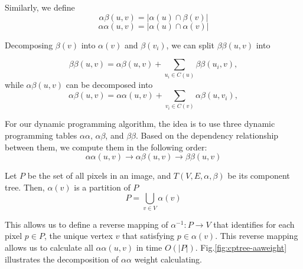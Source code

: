 Similarly, we define 
\begin{equation*} \label{eqn:alphabeta}
\alpha\beta(u,v) = |\alpha(u) \cap \beta(v)|  
\end{equation*}
\begin{equation*} \label{eqn:alphaalpha}
\alpha\alpha(u,v) = |\alpha(u)\cap\alpha(v)|
\end{equation*}

Decomposing $\beta(v)$ into $\alpha(v)$ and $\beta(v_i)$, we can split $\beta\beta(u,v)$ into

\begin{equation*} \label{eqn:betabeta-comp}
\beta\beta(u,v) = \alpha\beta(u,v) + \sum_{u_i \in C(u)}\beta\beta(u_i,v),
\end{equation*}
while $\alpha\beta(u,v)$ can be decomposed into
\begin{equation*} \label{eqn:alphabeta-comp}
\alpha\beta(u,v) = \alpha\alpha(u,v) + \sum_{v_i \in C(v)}\alpha\beta(u,v_i),
\end{equation*}

For our dynamic programming algorithm, the idea is to use three dynamic
programming tables $\alpha\alpha$, $\alpha\beta$, and $\beta\beta$. Based on the
dependency relationship between them, we compute them in the following
order:
\begin{equation*}
\alpha\alpha(u,v) \to \alpha\beta(u,v) \to \beta\beta(u,v)  
\end{equation*}

Let $P$ be the set of all pixels in an image, and $T(V,E,\alpha,\beta)$
be its component tree. Then, $\alpha(v)$ is a partition of $P$
\begin{equation} \label{eqn:alpha-decompose}
P = \bigcup_{v \in V}\alpha(v)
\end{equation}

This allows us to define a reverse mapping of $\alpha^{-1}: P \to V$ that
identifies for each pixel $p\in P$, the unique vertex $v$ that satisfying
$p\in\alpha(v)$.  This reverse mapping allows us to calculate all
$\alpha\alpha(u,v)$ in time $O(|P|)$. Fig.\ref{fig:cptree-aaweight} illustrates
the decomposition of $\alpha\alpha$ weight calculating.

